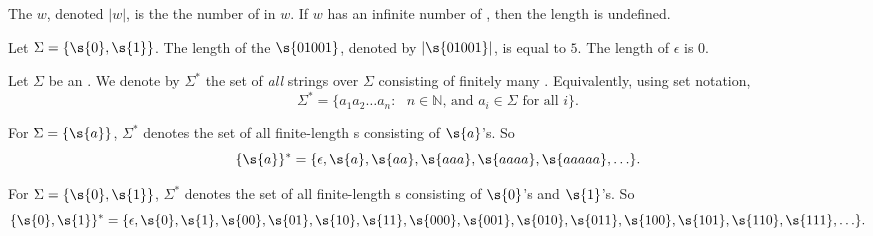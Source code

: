 \begin{flex}
\begin{definition} \label{definition:Length-of-a-string}
The  $w$, denoted $|w|$, is the the number of  in $w$. 
If $w$ has an infinite number of , then the length is undefined.
\end{definition}

\begin{example} \label{example:Lengths-of-01001-and-epsilon}
Let $\Sigma=\{\s{0},\s{1}\}$. 
The length of the  $\s{01001}$, denoted by $|\s{01001}|$, is equal to $5$. 
The length of $\epsilon$ is 0.
\end{example}
\end{flex}


\begin{flex}
\begin{definition} \label{definition:Star-operation-on-alphabets}
Let $\Sigma$ be an . 
We denote by $\Sigma^*$ the set of \emph{all} strings over $\Sigma$ consisting of finitely many . 
Equivalently, using set notation,
\[
    \Sigma^* = \{a_1a_2\ldots a_n : \text{ $n \in \mathbb{N}$, and $a_i \in \Sigma$ for all $i$}\}.
\]
\end{definition}

\begin{example}[$\{a\}^*$] \label{example:a}
For $\Sigma = \{\s{a}\}$, $\Sigma^*$ denotes the set of all finite-length s consisting of $\s{a}$'s. 
So
\[
    \{\s{a}\}^* = \{\epsilon, \s{a}, \s{aa}, \s{aaa}, \s{aaaa}, \s{aaaaa}, \ldots \}.
\]
\end{example}

\begin{example}[$\{0,1\}^*$] \label{example:01}
For $\Sigma = \{\s{0},\s{1}\}$, $\Sigma^*$ denotes the set of all finite-length s consisting of $\s{0}$'s and $\s{1}$'s. 
So
\[
    \{\s{0},\s{1}\}^* = \{\epsilon, \s{0}, \s{1}, \s{00}, \s{01}, \s{10}, \s{11}, \s{000}, \s{001}, \s{010}, \s{011}, \s{100}, \s{101}, \s{110}, \s{111}, \ldots\}.
\]
\end{example}
\end{flex}


